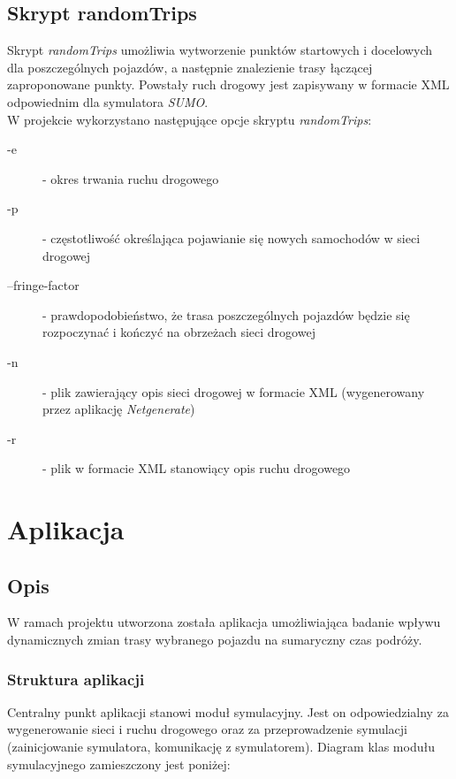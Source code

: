 \documentclass[11pt,a4paper]{article}
\begin{document}
\subsection{Skrypt randomTrips}

Skrypt \emph{randomTrips} umożliwia wytworzenie punktów startowych i docelowych dla poszczególnych pojazdów, a następnie znalezienie trasy łączącej zaproponowane punkty. Powstały ruch drogowy jest zapisywany w formacie XML odpowiednim dla symulatora \emph{SUMO}.\\[0.5cm]
W projekcie wykorzystano następujące opcje skryptu \emph{randomTrips}:
\begin{description}
	\item[-e] - okres trwania ruchu drogowego
	\item[-p] - częstotliwość określająca pojawianie się nowych samochodów w sieci drogowej
	\item[--fringe-factor] - prawdopodobieństwo, że trasa poszczególnych pojazdów będzie się rozpoczynać i kończyć na obrzeżach sieci drogowej
	\item[-n] - plik zawierający opis sieci drogowej w formacie XML (wygenerowany przez aplikację \emph{Netgenerate})
	\item[-r] - plik w formacie XML stanowiący opis ruchu drogowego 
\end{description}

\section{Aplikacja}

\subsection{Opis}

W ramach projektu utworzona została aplikacja umożliwiająca badanie wpływu dynamicznych zmian trasy wybranego pojazdu na sumaryczny czas podróży. 

\subsubsection{Struktura aplikacji}

Centralny punkt aplikacji stanowi moduł symulacyjny. Jest on odpowiedzialny za wygenerowanie sieci i ruchu drogowego oraz za przeprowadzenie symulacji (zainicjowanie symulatora, komunikację z symulatorem). Diagram klas modułu symulacyjnego zamieszczony jest poniżej:
\end{document}
